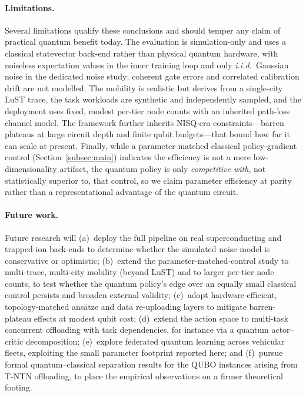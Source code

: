 \documentclass[11pt,a4paper]{article}
\theoremstyle{definition}
\begin{document}
\paragraph{Limitations.}
Several limitations qualify these conclusions and should temper any claim of practical quantum benefit today. The evaluation is simulation-only and uses a classical statevector back-end rather than physical quantum hardware, with noiseless expectation values in the inner training loop and only \emph{i.i.d.}\ Gaussian noise in the dedicated noise study; coherent gate errors and correlated calibration drift are not modelled. The mobility is realistic but derives from a single-city LuST trace, the task workloads are synthetic and independently sampled, and the deployment uses fixed, modest per-tier node counts with an inherited path-loss channel model. The framework further inherits NISQ-era constraints---barren plateaus at large circuit depth and finite qubit budgets---that bound how far it can scale at present. Finally, while a parameter-matched classical policy-gradient control (Section~\ref{subsec:main}) indicates the efficiency is not a mere low-dimensionality artifact, the quantum policy is only \emph{competitive with}, not statistically superior to, that control, so we claim parameter efficiency at parity rather than a representational advantage of the quantum circuit.

\paragraph{Future work.}
Future research will (a)~deploy the full pipeline on real superconducting and trapped-ion back-ends to determine whether the simulated noise model is conservative or optimistic; (b)~extend the parameter-matched-control study to multi-trace, multi-city mobility (beyond LuST) and to larger per-tier node counts, to test whether the quantum policy's edge over an equally small classical control persists and broaden external validity; (c)~adopt hardware-efficient, topology-matched ans\"atze and data re-uploading layers to mitigate barren-plateau effects at modest qubit cost; (d)~extend the action space to multi-task concurrent offloading with task dependencies, for instance via a quantum actor--critic decomposition; (e)~explore federated quantum learning across vehicular fleets, exploiting the small parameter footprint reported here; and (f)~pursue formal quantum--classical separation results for the QUBO instances arising from T-NTN offloading, to place the empirical observations on a firmer theoretical footing.
\end{document}
